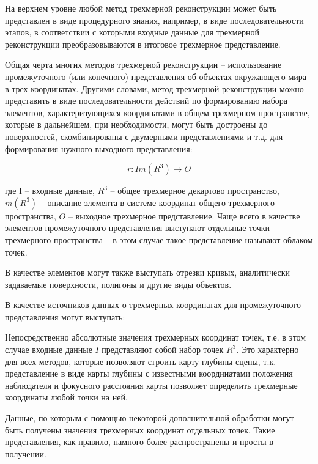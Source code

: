 На верхнем уровне любой метод трехмерной реконструкции может быть представлен в виде процедурного знания, например, в виде последовательности этапов, в соответствии с которыми входные данные для трехмерной реконструкции преобразовываются в итоговое трехмерное представление.

Общая черта многих методов трехмерной реконструкции -- использование промежуточного (или конечного) представления об объектах окружающего мира в трех координатах. Другими словами, метод трехмерной реконструкции можно представить в виде последовательности действий по формированию набора элементов, характеризующихся координатами в общем трехмерном пространстве, которые в дальнейшем, при необходимости, могут быть достроены до поверхностей, скомбинированы с двумерными представлениями и т.д. для формирования нужного выходного представления:

\begin{equation}
    r:I{m(R^3)}\rightarrow O
\end{equation}

где I -- входные данные, $R^3$ -- общее трехмерное декартово пространство, $m(R^3)$ -- описание элемента в системе координат общего трехмерного пространства, $O$ -- выходное трехмерное представление. Чаще всего в качестве элементов промежуточного представления выступают отдельные точки трехмерного пространства -- в этом случае такое представление называют облаком точек.

В качестве элементов могут также выступать отрезки кривых, аналитически задаваемые поверхности, полигоны и другие виды объектов.

В качестве источников данных о трехмерных координатах для промежуточного представления могут выступать:
\begin{textitemize}
    \item Непосредственно абсолютные значения трехмерных координат точек, т.е. в этом случае входные данные $I$ представляют собой набор точек ${R^3}$. Это характерно для всех методов, которые позволяют строить карту глубины сцены, т.к. представление в виде карты глубины с известными координатами положения наблюдателя и фокусного расстояния карты позволяет определить трехмерные координаты любой точки на ней.
    \item Данные, по которым с помощью некоторой дополнительной обработки могут быть получены значения трехмерных координат отдельных точек. Такие представления, как правило, намного более распространены и просты в получении.
\end{textitemize}

